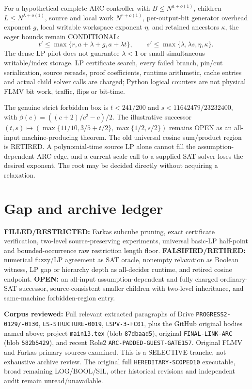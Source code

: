 \documentclass[11pt]{article}
\begin{document}
For a hypothetical complete ARC controller with $B\le N^{a+o(1)}$, children $L\le N^{\lambda+o(1)}$, source and local work $N^{r+o(1)}$, per-output-bit generator overhead exponent $g$, local writable workspace exponent $\eta$, and retained ancestors $\kappa$, the eager bounds remain CONDITIONAL:
\[
t'\le\max\{r,a+\lambda+g,a+\lambda t\},\qquad
s'\le\max\{\lambda,\lambda s,\eta,\kappa\}.
\]
The dense LP pilot does not guarantee $\lambda<1$ or small simultaneous writable/index storage. LP certificate search, every failed branch, pin/cut serialization, source rereads, proof coefficients, runtime arithmetic, cache entries and actual child solver calls are charged; Python logical counters are not physical FLMV bit work, traffic, flips or bit-time.

The genuine strict forbidden box is $t<241/200$ and $s<11642479/23232400$, with $\beta(c)=((c+2)/c^2-c)/2$. The illustrative successor $(t,s)\mapsto(\max\{11/10,3/5+t/2\},\max\{1/2,s/2\})$ remains OPEN as an all-input machine-producing theorem. The old universal cosine sum/product region is RETIRED. A polynomial-time source LP alone cannot fill the assumption-dependent ARC edge, and a current-scale call to a supplied SAT solver loses the desired exponent. The root may be decided directly without acquiring a relaxation.

\section{Gap and archive ledger}
\textbf{FILLED/RESTRICTED:} Farkas subcube pruning, exact certificate verification, two-level source-preserving experiments, universal basic-LP half-point and bounded-occurrence raw restriction length floor. \textbf{FALSIFIED/RETIRED:} numerical fuzzy/LP agreement as SAT oracle, nonempty relaxation as Boolean witness, LP gap or hierarchy depth as all-decider runtime, and retired cosine endpoint. \textbf{OPEN:} an all-input assumption-dependent and fully charged ordinary-SAT successor, source-consistent smaller children with two-level inheritance, and same-machine forbidden-region entry.

\textbf{Corpus reviewed:} Full relevant extracted paragraphs of Drive \texttt{PROGRESS2-0129/-0130}, \texttt{ES-STRUCTURE-0019}, \texttt{LSPV-3-FC01}, plus the GitHub original bodies named above; project \texttt{main13.tex} (blob \texttt{87dbaad5}), original \texttt{FINAL-LINK-ARC} (blob \texttt{582b5429}), and recent Role2 \texttt{ARC-PADDED-GUEST-GATE157}. Original FLMV and Farkas primary sources examined. This is a SELECTIVE tranche, not exhaustive archive review. The original full \texttt{HEREDITARY-SCOPED10} executable, broad remaining LOG/BOOL/SIL, other historical revisions and independent audit remain unread/unavailable.
\end{document}
